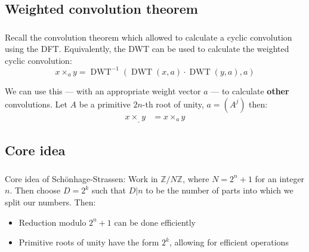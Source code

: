 \documentclass{beamer}
\DeclareMathOperator{\DWT}{DWT}
\begin{document}
\subsection{Weighted convolution theorem}

\begin{frame}
		\frametitle{\secname}
		\framesubtitle{\subsecname}

		Recall the convolution theorem which allowed to calculate a cyclic
		convolution using the DFT. Equivalently, the DWT can be used to
		calculate the weighted cyclic convolution:
		\[
				x \times_a y = \DWT^{-1}(\DWT(x, a) \cdot \DWT(y, a), a)
		\]

		We can use this --- with an appropriate weight vector $a$ --- to
		calculate \textbf{other} convolutions. Let $A$ be a primitive $2n$-th
		root of unity, $a = (A^j)$ then:
		\begin{align*}
				x \times_{\_} y & = x \times_a y
		\end{align*}
\end{frame}

\subsection{Core idea}

\begin{frame}
		\frametitle{\secname}
		\framesubtitle{\subsecname}

		Core idea of Schönhage-Strassen: Work in $\mathbb{Z} / N \mathbb{Z}$,
		where $N = 2^n + 1$ for an integer $n$. Then choose $D = 2^k$ such that
		$D | n$ to be the number of parts into which we split our numbers. Then:

		\begin{itemize}
				\item Reduction modulo $2^n + 1$ can be done efficiently
				\item Primitive roots of unity have the form $2^k$, allowing for
						efficient operations
		\end{itemize}

\end{frame}
\end{document}
